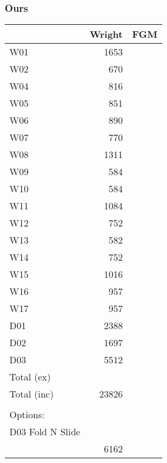 \subsubsection{Ours}
\begin{tabular}{|l|r|r|}
\hline
    &Wright     & FGM           
\\ \hline
W01 & 1653                              
\\ \hline
W02 & 670                            
\\ \hline
W04 & 816                             
\\ \hline
W05 & 851                            
\\ \hline
W06 & 890                            
\\ \hline
W07 & 770                            
\\ \hline
W08 & 1311                            
\\ \hline
W09 & 584                            
\\ \hline
W10 & 584                             
\\ \hline
W11 &1084                            
\\ \hline
W12 & 752                       
\\ \hline
W13  &582                           
\\ \hline
W14 & 752                            
\\ \hline
W15 &1016                            
\\ \hline
W16 &957                            
\\ \hline
W17 &957                            
\\ \hline
D01 &2388                            
\\ \hline
D02 &1697                            
\\ \hline
D03 &5512                            
\\ \hline
Total (ex)                      
\\ \hline
Total (inc) & 23826                    
\\ \hline
\\ \hline
Options: 
\\ \hline
D03 Fold N Slide \\ & 6162
\\ \hline

\end{tabular}


